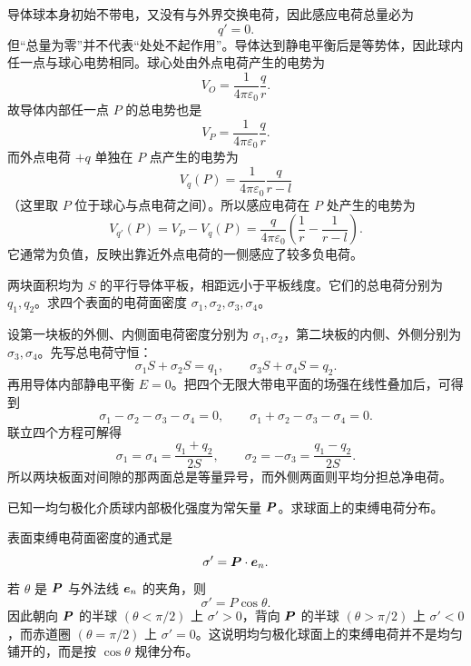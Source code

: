 \documentclass[lang=cn,11pt]{elegantbook}
\begin{document}
\begin{solution}
导体球本身初始不带电，又没有与外界交换电荷，因此感应电荷总量必为
\[
\boxed{q'=0}.
\]
但“总量为零”并不代表“处处不起作用”。导体达到静电平衡后是等势体，因此球内任一点与球心电势相同。球心处由外点电荷产生的电势为
\[
V_O=\frac{1}{4\pi\varepsilon_0}\frac{q}{r}.
\]
故导体内部任一点 \(P\) 的总电势也是
\[
V_P=\frac{1}{4\pi\varepsilon_0}\frac{q}{r}.
\]
而外点电荷 \(+q\) 单独在 \(P\) 点产生的电势为
\[
V_q(P)=\frac{1}{4\pi\varepsilon_0}\frac{q}{r-l}
\]
（这里取 \(P\) 位于球心与点电荷之间）。所以感应电荷在 \(P\) 处产生的电势为
\[
V_{q'}(P)=V_P-V_q(P)
=\frac{q}{4\pi\varepsilon_0}\left(\frac{1}{r}-\frac{1}{r-l}\right).
\]
它通常为负值，反映出靠近外点电荷的一侧感应了较多负电荷。
\end{solution}

\begin{example}[两块已知总电荷的大平板各表面电荷密度]
两块面积均为 \(S\) 的平行导体平板，相距远小于平板线度。它们的总电荷分别为 \(q_1,q_2\)。求四个表面的电荷面密度 \(\sigma_1,\sigma_2,\sigma_3,\sigma_4\)。
\end{example}

\begin{solution}
设第一块板的外侧、内侧面电荷密度分别为 \(\sigma_1,\sigma_2\)，第二块板的内侧、外侧分别为 \(\sigma_3,\sigma_4\)。先写总电荷守恒：
\[
\sigma_1S+\sigma_2S=q_1,
\qquad
\sigma_3S+\sigma_4S=q_2.
\]
再用导体内部静电平衡 \(E=0\)。把四个无限大带电平面的场强在线性叠加后，可得到
\[
\sigma_1-\sigma_2-\sigma_3-\sigma_4=0,
\qquad
\sigma_1+\sigma_2-\sigma_3-\sigma_4=0.
\]
联立四个方程可解得
\[
\boxed{
\sigma_1=\sigma_4=\frac{q_1+q_2}{2S},
\qquad
\sigma_2=-\sigma_3=\frac{q_1-q_2}{2S}.
}
\]
所以两块板面对间隙的那两面总是等量异号，而外侧两面则平均分担总净电荷。
\end{solution}

\begin{example}[均匀极化介质球的束缚电荷分布]
已知一均匀极化介质球内部极化强度为常矢量 \(\vb*{P}\)。求球面上的束缚电荷分布。
\end{example}

\begin{solution}
表面束缚电荷面密度的通式是
\[
\sigma'=\vb*{P}\cdot \vb*{e}_n.
\]
若 \(\theta\) 是 \(\vb*{P}\) 与外法线 \(\vb*{e}_n\) 的夹角，则
\[
\boxed{\sigma'=P\cos\theta}.
\]
因此朝向 \(\vb*{P}\) 的半球 \((\theta<\pi/2)\) 上 \(\sigma'>0\)，背向 \(\vb*{P}\) 的半球 \((\theta>\pi/2)\) 上 \(\sigma'<0\)，而赤道圈 \((\theta=\pi/2)\) 上 \(\sigma'=0\)。这说明均匀极化球面上的束缚电荷并不是均匀铺开的，而是按 \(\cos\theta\) 规律分布。
\end{solution}
\end{document}

